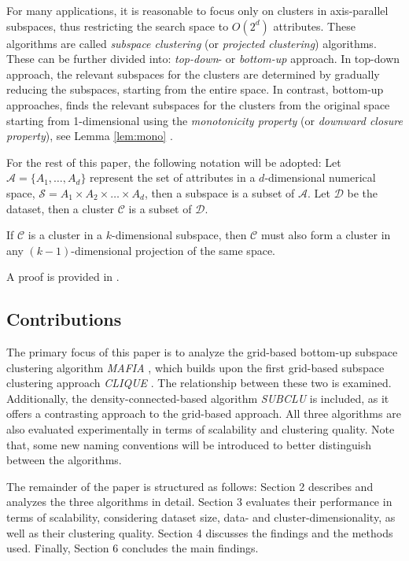 For many applications, it is reasonable to focus only on clusters in axis-parallel subspaces, thus restricting the search space to $O(2^d)$ attributes. These algorithms are called \textit{subspace clustering} (or \textit{projected clustering}) algorithms. These can be further divided into: \textit{top-down}- or \textit{bottom-up} approach. In top-down approach, the relevant subspaces for the clusters are determined by gradually reducing the subspaces, starting from the entire space. In contrast, bottom-up approaches, finds the relevant subspaces for the clusters from the original space starting from 1-dimensional using the \textit{monotonicity property} (or \textit{downward closure property}), see Lemma \ref{lem:mono} \cite{clique}. \cite[p.~8,~11]{kriegel-2009}

For the rest of this paper, the following notation will be adopted: Let $\mathcal{A} = \{A_1, \dots, A_d\}$ represent the set of attributes in a $d$-dimensional numerical space, $\mathcal{S} = A_1 \times A_2 \times \dots \times A_d$, then a subspace is a subset of $\mathcal{A}$. Let $\mathcal{D}$ be the dataset, then a cluster $\mathcal{C}$ is a subset of $\mathcal{D}$.

\begin{lemma}\label{lem:mono}
    If $\mathcal{C}$ is a cluster in a $k$-dimensional subspace, then $\mathcal{C}$ must also form a cluster in any $(k-1)$-dimensional projection of the same space.
\end{lemma}
A proof is provided in \cite{clique}.

\subsection{Contributions}
The primary focus of this paper is to analyze the grid-based bottom-up subspace clustering algorithm \textit{MAFIA} \cite{mafia}, which builds upon the first grid-based subspace clustering approach \textit{CLIQUE} \cite{clique}. The relationship between these two is examined. Additionally, the density-connected-based algorithm \textit{SUBCLU} \cite{subclu} is included, as it offers a contrasting approach to the grid-based approach. All three algorithms are also evaluated experimentally in terms of scalability and clustering quality. Note that, some new naming conventions will be introduced to better distinguish between the algorithms.

The remainder of the paper is structured as follows: Section 2 describes and analyzes the three algorithms in detail. Section 3 evaluates their performance in terms of scalability, considering dataset size, data- and cluster-dimensionality, as well as their clustering quality. Section 4 discusses the findings and the methods used. Finally, Section 6 concludes the main findings.